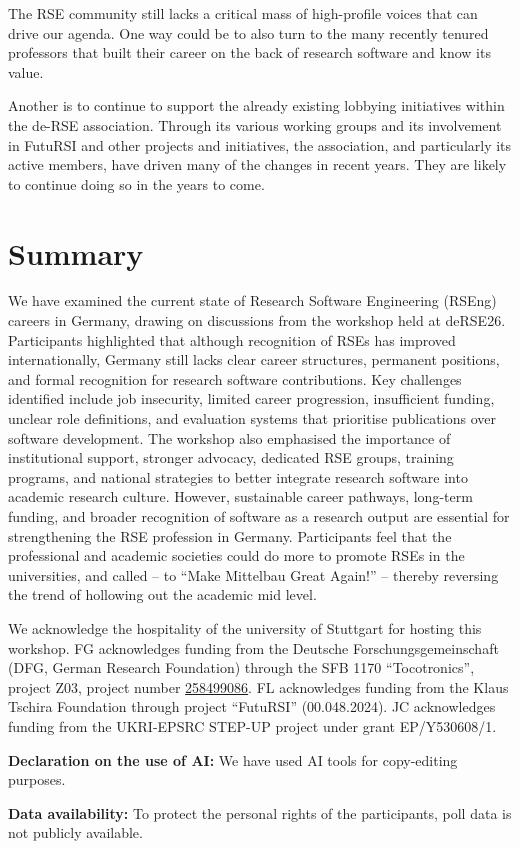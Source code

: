 \documentclass{eceasst}
\newcommand{\geprislink}[1]{\href{https://gepris.dfg.de/gepris/projekt/#1?language=en}{#1}}
\newenvironment{aiuse}{%
  \par\vspace{11pt}%
  \noindent\textbf{Declaration on the use of AI:}\enspace}{%
  \par\vspace{11pt}}
\newenvironment{data}{%
  \par\vspace{11pt}%
  \noindent\textbf{Data availability:}\enspace}{%
  \par\vspace{11pt}}
\begin{document}
The RSE community still lacks a critical mass of high-profile voices that can drive our agenda.
One way could be to also turn to the many recently tenured professors that built their career on the back of research software and know its value.

Another is to continue to support the already existing lobbying initiatives within the de-RSE association.
Through its various working groups and its involvement in FutuRSI and other projects and initiatives, the association, and particularly its active members, have driven many of the changes in recent years. They are likely to continue doing so in the years to come.

\section{Summary}
We have  examined the current state of Research Software Engineering (RSEng) careers in Germany, drawing on discussions from the workshop held at deRSE26.
Participants highlighted that although recognition of RSEs has improved internationally, Germany still lacks clear career structures, permanent positions, and formal recognition for research software contributions.
Key challenges identified include job insecurity, limited career progression, insufficient funding, unclear role definitions, and evaluation systems that prioritise publications over software development.
The workshop also emphasised the importance of institutional support, stronger advocacy, dedicated RSE groups, training programs, and national strategies to better integrate research software into academic research culture.
However, sustainable career pathways, long-term funding, and broader recognition of software as a research output are essential for strengthening the RSE profession in Germany.
Participants feel that the professional and academic societies could do more to promote RSEs in the universities,
and called  -- to \enquote{Make Mittelbau Great Again!} -- thereby reversing the trend of hollowing out the academic mid level.

\begin{acknowledge}
We acknowledge the hospitality of the university of Stuttgart for hosting this workshop.
FG acknowledges funding from the Deutsche Forschungsgemeinschaft (DFG, German Research Foundation) through the SFB 1170 “Tocotronics”, project Z03, project number \geprislink{258499086}.
FL acknowledges funding from the Klaus Tschira Foundation through project “FutuRSI” (00.048.2024).
JC acknowledges funding from the UKRI-EPSRC STEP-UP project under grant EP/Y530608/1.
\end{acknowledge}

\begin{aiuse}
We have used AI tools for copy-editing purposes.
\end{aiuse}

\begin{data}
To protect the personal rights of the participants, poll data is not publicly available.
\end{data}



\end{document}
